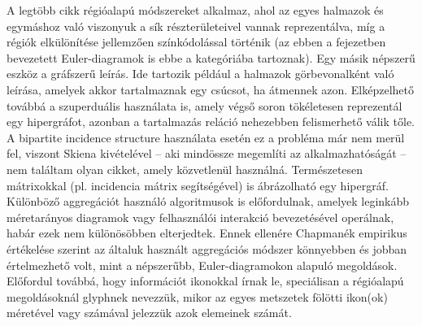 A legtöbb cikk régióalapú módszereket alkalmaz, ahol az egyes halmazok és egymáshoz való viszonyuk a sík részterületeivel vannak reprezentálva, míg a régiók elkülönítése jellemzően színkódolással történik\cite{eulerape, euler_polygon_article, simonetto_undrawable} (az ebben a fejezetben bevezetett Euler-diagramok is ebbe a kategóriába tartoznak). Egy másik népszerű eszköz a gráfszerű leírás. Ide tartozik például a halmazok görbevonalként való leírása, amelyek akkor tartalmaznak egy csúcsot, ha átmennek azon\cite{linesets}. Elképzelhető továbbá a szuperduális használata is, amely végső soron tökéletesen reprezentál egy hipergráfot, azonban a tartalmazás reláció nehezebben felismerhető válik tőle. A bipartite incidence structure használata esetén ez a probléma már nem merül fel, viszont Skiena kivételével -- aki mindössze megemlíti az alkalmazhatóságát\cite{bpis_vis} -- nem találtam olyan cikket, amely közvetlenül használná. Természetesen mátrixokkal (pl. incidencia mátrix segítségével) is ábrázolható egy hipergráf. Különböző aggregációt használó algoritmusok is előfordulnak, amelyek leginkább méretarányos diagramok vagy felhasználói interakció bevezetésével operálnak\cite{wellmatched_important, interactive_sets}, habár ezek nem különösöbben elterjedtek. Ennek ellenére Chapmanék empirikus értékelése szerint az általuk használt aggregációs módszer könnyebben és jobban értelmezhető volt, mint a népszerűbb, Euler-diagramokon alapuló megoldások\cite{wellmatched_important}. Előfordul továbbá, hogy információt ikonokkal írnak le, speciálisan a régióalapú megoldásoknál glyphnek nevezzük, mikor az egyes metszetek fölötti ikon(ok) méretével vagy számával jelezzük azok elemeinek számát.



